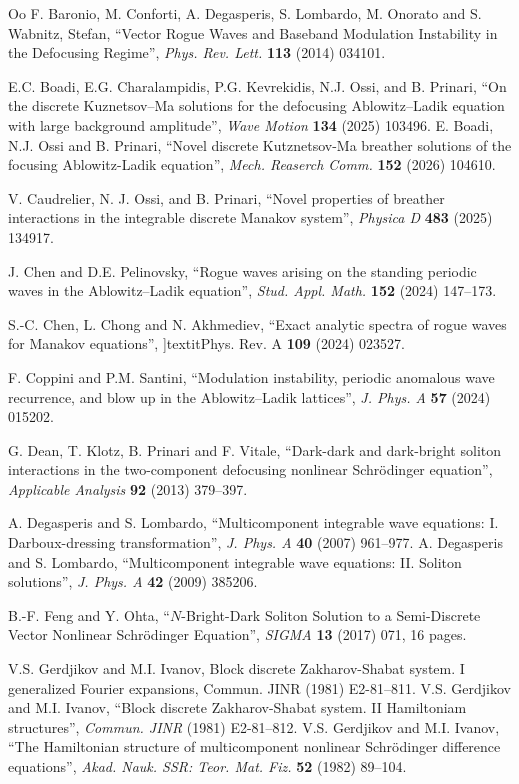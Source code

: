 \documentclass{article}
\begin{document}
\begin{thebibliography}{Oo}
 F. Baronio, M. Conforti, A. Degasperis, S. Lombardo, M. Onorato and S. Wabnitz, Stefan, ``Vector Rogue Waves and Baseband Modulation Instability in the Defocusing Regime'', \textit{Phys. Rev. Lett.} \textbf{113} (2014) 034101.

 E.C. Boadi, E.G. Charalampidis, P.G. Kevrekidis, N.J. Ossi, and B. Prinari, ``On the discrete Kuznetsov–Ma solutions for the defocusing Ablowitz–Ladik equation with large background amplitude'', \textit{Wave Motion} \textbf{134} (2025) 103496.
 E. Boadi, N.J. Ossi and B. Prinari, ``Novel discrete Kutznetsov-Ma breather solutions of the focusing Ablowitz-Ladik equation'', \textit{Mech. Reaserch Comm.} \textbf{152} (2026) 104610.

 V. Caudrelier, N. J. Ossi, and B. Prinari, ``Novel properties of breather interactions in the integrable discrete Manakov system'', \textit{Physica D} \textbf{483} (2025) 134917.

 J. Chen and D.E. Pelinovsky, ``Rogue waves arising on the standing periodic waves in the Ablowitz–Ladik equation'', \textit{Stud. Appl. Math.} \textbf{152} (2024) 147–173.

 S.-C. Chen, L. Chong and N. Akhmediev, ``Exact analytic spectra of rogue waves for Manakov equations'', 
]textit{Phys. Rev. A} \textbf{109} (2024) 023527.

 F. Coppini and P.M. Santini, ``Modulation instability, periodic anomalous wave recurrence, and blow up in the Ablowitz–Ladik lattices'', \textit{J. Phys. A} \textbf{57} (2024) 015202.

 G. Dean, T. Klotz, B. Prinari and F. Vitale, ``Dark-dark and dark-bright soliton interactions in the two-component defocusing nonlinear Schr\"odinger equation'', \textit{Applicable Analysis} \textbf{92} (2013) 379--397.

 A. Degasperis and S. Lombardo, ``Multicomponent integrable wave equations: I. Darboux-dressing transformation'', \textit{J. Phys. A} \textbf{40} (2007) 961--977.
 A. Degasperis and S. Lombardo, ``Multicomponent integrable wave equations: II. Soliton solutions'', \textit{J. Phys. A} \textbf{42} (2009) 385206.

 B.-F. Feng and Y. Ohta,  ``$N$-Bright-Dark Soliton Solution to a Semi-Discrete Vector Nonlinear Schr\"odinger Equation'', \textit{SIGMA} \textbf{13} (2017) 071, 16 pages.

 V.S. Gerdjikov and M.I. Ivanov, Block discrete Zakharov-Shabat system. I generalized Fourier expansions, Commun. JINR (1981) E2-81--811.
 V.S. Gerdjikov and M.I. Ivanov, ``Block discrete Zakharov-Shabat system. II Hamiltoniam structures'', \textit{Commun. JINR} (1981) E2-81--812.
 V.S. Gerdjikov and M.I. Ivanov, ``The Hamiltonian structure of multicomponent nonlinear Schr\"odinger difference equations'', \textit{Akad. Nauk. SSR: Teor. Mat. Fiz.} \textbf{52} (1982) 89--104.


\end{thebibliography}
\end{document}
